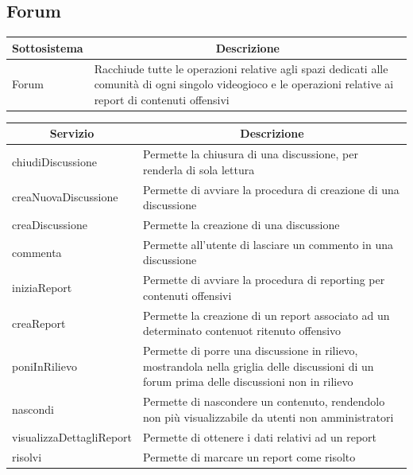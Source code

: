 \newpage
\subsection{Forum}
\begin{center}
	\begin{tabular}{||l | p{22em}||} 
	\hline
	\multicolumn{1}{||c|}{\textbf{Sottosistema}} & \multicolumn{1}{c||}{\textbf{Descrizione}} \\
	\hline\hline
	Forum & Racchiude tutte le operazioni relative agli spazi dedicati alle comunità di ogni singolo videogioco e le operazioni relative ai report di contenuti offensivi \\ 
	\hline
   \end{tabular}
\end{center}

\begin{center}
	\begin{tabular}{||l | p{20em}||} 
	\hline
	\multicolumn{1}{||c|}{\textbf{Servizio}} & \multicolumn{1}{c||}{\textbf{Descrizione}} \\
	\hline\hline
	chiudiDiscussione & Permette la chiusura di una discussione, per renderla di sola lettura \\
	\hline
	creaNuovaDiscussione & Permette di avviare la procedura di creazione di una discussione \\
	\hline
	creaDiscussione & Permette la creazione di una discussione \\
	\hline
	commenta & Permette all’utente di lasciare un commento in una discussione \\
	\hline
	iniziaReport & Permette di avviare la procedura di reporting per contenuti offensivi \\
	\hline
	creaReport & Permette la creazione di un report associato ad un determinato contenuot ritenuto offensivo \\
	\hline
	poniInRilievo & Permette di porre una discussione in rilievo, mostrandola nella griglia delle discussioni di un forum prima delle discussioni non in rilievo \\
	\hline
	nascondi & Permette di nascondere un contenuto, rendendolo non più visualizzabile da utenti non amministratori \\
	\hline
	visualizzaDettagliReport & Permette di ottenere i dati relativi ad un report \\
	\hline
	risolvi & Permette di marcare un report come risolto \\
	\hline
   \end{tabular}
\end{center}

